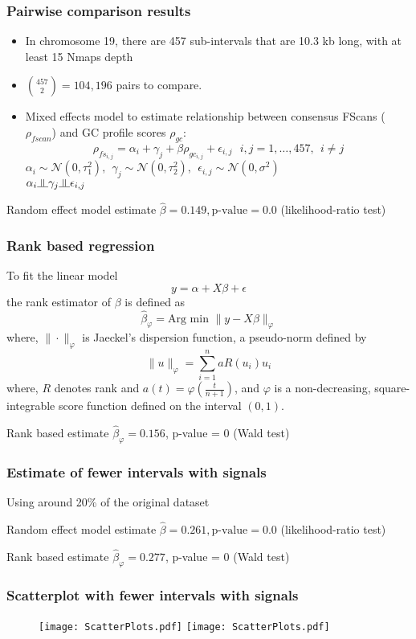 \documentclass[10pt,dvipsnames,table]{beamer}
\begin{document}
\begin{frame}
\frametitle{Pairwise comparison results}
\begin{itemize}
\item In chromosome 19, there are 457 sub-intervals that are 10.3 kb long, with at least 15 Nmaps depth
\item $ \binom {457} {2} = 104,196 $ pairs to compare. 
\item Mixed effects model to estimate relationship between consensus FScans ($\rho_{fscan}$) and GC profile scores $\rho_{gc}$:
\[ 
\rho_{fs_{i,j}} = \alpha_i + \gamma_j + \beta \rho_{gc_{i,j}} + \epsilon_{i,j}\ \ \ i, j = 1, \dots, 457,\ \ i \ne j
\]
$\alpha_i \sim \mathcal{N}(0, \tau_1^2), \ \ \gamma_j \sim \mathcal{N}(0, \tau_2^2), \ \ \epsilon_{i,j} \sim \mathcal{N}(0, \sigma^2)$ \\
$ \alpha_i \indep \gamma_j \indep \epsilon_{i,j}$
\end{itemize}

\begin{block}{Random effect model estimate}
$\hat{\beta} = 0.149, \text{p-value} = 0.0$ (likelihood-ratio test)
\end{block}
\end{frame}

\begin{frame}
\frametitle{Rank based regression}
To fit the linear model
\[ y = \alpha + X\beta + \epsilon\]
the rank estimator of $\beta$ is defined as
\[ \hat{\beta}_{\varphi} = \text{Arg min } \| y - X\beta\|_{\varphi}\]
where, $\| \cdot \|_{\varphi}$ is Jaeckel’s dispersion function, a pseudo-norm defined by
\[ \| u \|_{\varphi} = \sum\limits_{i=1}^n a R(u_i)u_i\]
where, $R$ denotes rank and $a(t) = \varphi(\frac{t}{n+1})$, and $\varphi$ is a
non-decreasing, square-integrable score function defined on the interval $(0, 1)$.

\begin{block}{Rank based estimate}
$ \hat{\beta}_{\varphi} = 0.156$, p-value = 0 (Wald test)
\end{block}

\end{frame}

\begin{frame}
\frametitle{Estimate of fewer intervals with signals}
Using around 20\% of the original dataset

\begin{block}{Random effect model estimate}
$\hat{\beta} = 0.261, \text{p-value} = 0.0$ (likelihood-ratio test)
\end{block}

\begin{block}{Rank based estimate}
$ \hat{\beta}_{\varphi} = 0.277$, p-value = 0 (Wald test)
\end{block}
\end{frame}

\begin{frame}
\frametitle{Scatterplot with fewer intervals with signals}
\begin{figure}
\centering
\texttt{[image: ScatterPlots.pdf]}
\texttt{[image: ScatterPlots.pdf]}
\end{figure}

\end{frame}
\end{document}
